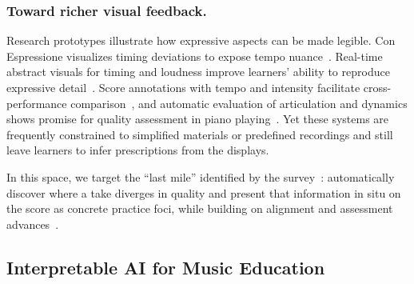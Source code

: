 \documentclass[sigconf,review,anonymous]{acmart}
\begin{document}
\subsubsection{Toward richer visual feedback.}
Research prototypes illustrate how expressive aspects can be made legible. Con Espressione visualizes timing deviations to expose tempo nuance~\cite{Widmer2017}. Real-time abstract visuals for timing and loudness improve learners’ ability to reproduce expressive detail~\cite{Sadakata2008}. Score annotations with tempo and intensity facilitate cross-performance comparison~\cite{Trevino2014}, and automatic evaluation of articulation and dynamics shows promise for quality assessment in piano playing~\cite{Phanichraksaphong2021}. Yet these systems are frequently constrained to simplified materials or predefined recordings and still leave learners to infer prescriptions from the displays.

In this space, we target the ``last mile'' identified by the survey~\cite{Kim2022APPA}: automatically discover where a take diverges in quality and present that information in situ on the score as concrete practice foci, while building on alignment and assessment advances~\cite{nakamura2016,liang2024,Widmer2017,Sadakata2008,Trevino2014,Phanichraksaphong2021,Kim2022APPA}.

\subsection{Interpretable AI for Music Education}
\label{sec:rw-xai}
\end{document}
